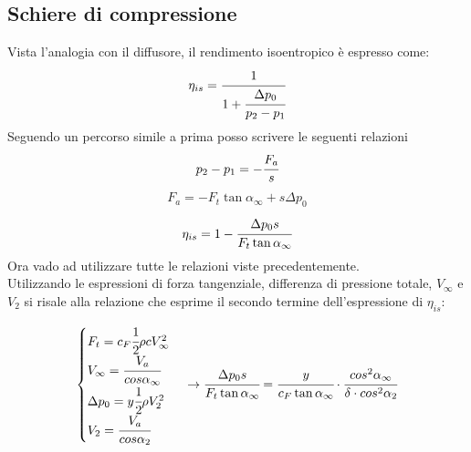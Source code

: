 \subsection{Schiere di compressione}
Vista l'analogia con il diffusore, il rendimento isoentropico è espresso come:
\begin{align*}
\eta_{is} = \cfrac{1}{1 + \cfrac{\Delta p_0}{p_2-p_1}}
\end{align*}
Seguendo un percorso simile a prima posso scrivere le seguenti relazioni
\begin{align*}
p_2-p_1 = -\cfrac{F_a}{s}
\end{align*}
\begin{align*}
F_a = -F_t \tan \alpha_{\infty} + s \Delta p_0
\end{align*}
\begin{align*}
\eta_{is} = 1- \cfrac{\Delta p_0 s}{F_t \tan \alpha_{\infty}}
\end{align*}
Ora vado ad utilizzare tutte le relazioni viste precedentemente.\\
Utilizzando le espressioni di forza tangenziale, differenza di pressione totale, $V_\infty$ e $V_2$ si risale alla relazione che esprime il secondo termine dell'espressione di $\eta_{is}$:

\begin{align*}
\begin{cases}
F_t = c_F \cfrac{1}{2} \rho c V_{\infty}^2\\
V_{\infty} = \cfrac{V_a}{cos \alpha_{\infty}}\\
\Delta p_0 = y \cfrac{1}{2} \rho V_2^2\\
V_2 = \cfrac{V_a}{cos \alpha_2}
\end{cases}
\rightarrow
\cfrac{\Delta p_0 s}{F_t \tan \alpha_{\infty}} = \cfrac{y}{c_F \tan \alpha_{\infty}} \cdot \cfrac{cos^2 \alpha_{\infty}}{\delta \cdot cos^2 \alpha_2}
\end{align*}


